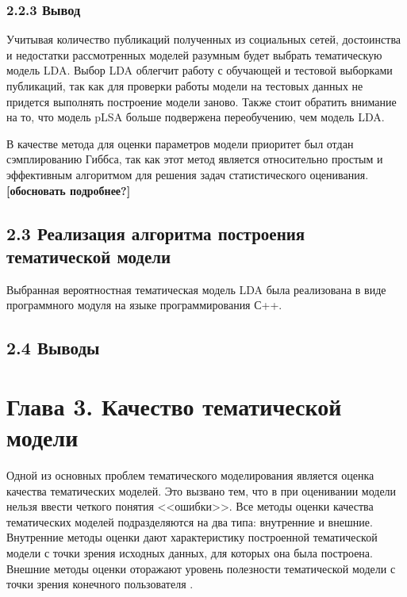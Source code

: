 \documentclass[a4paper]{report}
\begin{document}
	
	\subsubsection{2.2.3 Вывод}
	Учитывая количество публикаций полученных из социальных сетей, достоинства и недостатки рассмотренных моделей разумным будет выбрать тематическую модель LDA. Выбор LDA облегчит работу с обучающей и тестовой выборками публикаций, так как для проверки работы модели на тестовых данных не придется выполнять построение модели заново.  Также стоит обратить внимание на то, что модель pLSA больше подвержена переобучению, чем модель LDA.
	
	В качестве метода для оценки параметров модели приоритет был отдан сэмплированию Гиббса,  так как этот метод является относительно простым и эффективным алгоритмом для решения задач статистического оценивания. \textbf{[обосновать подробнее?]}

	\subsection{2.3 Реализация алгоритма построения тематической модели}
	
	
	Выбранная вероятностная тематическая модель LDA была реализована в виде программного модуля на языке программирования  С++. 
	\subsection{2.4 Выводы}
	
	
	
	\newpage
	\section{Глава 3. Качество тематической модели}
	
	Одной из основных проблем тематического моделирования является оценка качества тематических моделей. 
	Это вызвано тем, что в при оценивании модели нельзя ввести четкого понятия <<ошибки>>.
	Все методы оценки качества тематических моделей подразделяются на два типа: внутренние и внешние. Внутренние методы оценки дают характеристику построенной тематической модели с точки зрения исходных данных, для которых она была построена. 
	Внешние методы оценки оторажают уровень полезности тематической модели с точки зрения конечного пользователя \cite{bib:Voron1}.
	
\end{document}
